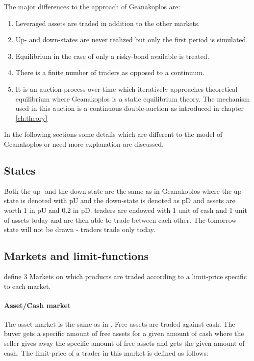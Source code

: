 \documentclass[../Bachelorarbeit.tex]{subfiles}
\begin{document}
The major differences to the approach of Geanakoplos are:
\begin{enumerate}
\item Leveraged assets are traded in addition to the other markets.
\item Up- and down-states are never realized but only the first period is simulated.
\item Equilibrium in the case of only a risky-bond available is treated.
\item There is a finite number of traders as opposed to a continuum.
\item It is an auction-process over time which iteratively approaches theoretical equilibrium where Geanakoplos is a static equilibrium theory. The mechanism used in this auction is a continuous double-auction as introduced in chapter \ref{ch:theory}
\end{enumerate}

In the following sections some details which are different to the model of Geanakoplos or need more explanation are discussed.

\subsection{States}
Both the up- and the down-state are the same as in Geanakoplos where the up-state is denoted with pU and the down-state is denoted as pD and assets are worth 1 in pU and 0.2 in pD. traders are endowed with 1 unit of cash and 1 unit of assets today and are then able to trade between each other. The tomorrow-state will not be drawn - traders trade only today.

\subsection{Markets and limit-functions}
\label{sec:LIMIT_FUNCTIONS}

\cite{Breuer2015} define 3 Markets on which products are traded according to a limit-price specific to each market.

\paragraph{Asset/Cash market}
The asset market is the same as in \cite{Geanakoplos2009}. Free assets are traded against cash. The buyer gets a specific amount of free assets for a given amount of cash where the seller gives away the specific amount of free assets and gets the given amount of cash. The limit-price of a trader in this market is defined as follows:
\end{document}
